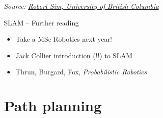 \documentclass[compress,xcolor=table]{beamer}
\newcommand{\source}[2]{{\tiny\it Source: \href{#1}{#2}}}
\begin{document}
\begin{frame}[plain]

    \begin{center}

    \source{http://youtu.be/Q1ipn42rMh8}{Robert Sim, University of British Columbia}
    \end{center}

\end{frame}



\begin{frame}{SLAM -- Further reading}

    \begin{itemize}
        \item Take a MSc Robotics next year!
        \item \href{http://www.computerrobotvision.org/2010/slam_camp/collier_intro.pdf}{Jack
            Collier introduction (!!) to SLAM}
        \item Thrun, Burgard, Fox, \emph{Probabilistic Robotics}
    \end{itemize}
\end{frame}

\section{Path planning}
\end{document}

